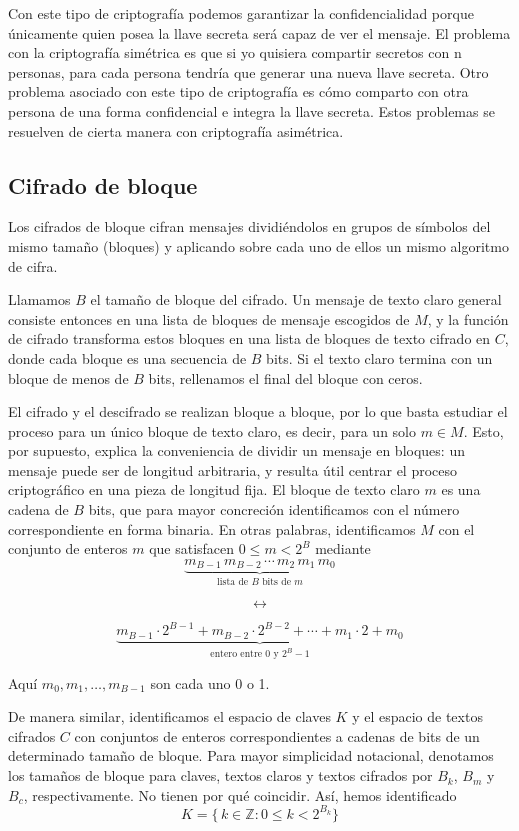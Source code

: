 Con este tipo de criptografía podemos garantizar la confidencialidad porque únicamente quien posea la llave secreta será capaz de ver el mensaje.
El problema con la criptografía simétrica es que si yo quisiera compartir secretos con n personas, para cada persona tendría que generar una nueva llave secreta.
Otro problema asociado con este tipo de criptografía es cómo comparto con otra persona de una forma confidencial e integra la llave secreta.
Estos problemas se resuelven de cierta manera con criptografía asimétrica.

\subsection{Cifrado de bloque}
Los cifrados de bloque cifran mensajes dividiéndolos en grupos de símbolos del mismo tamaño (bloques) y aplicando sobre cada uno de ellos un mismo algoritmo de cifra.

Llamamos \(B\) el tamaño de bloque del cifrado. Un mensaje de texto claro general consiste entonces en una lista de bloques de mensaje escogidos de \(M\), y la función de cifrado transforma estos bloques en una lista de bloques de texto cifrado en \(C\), donde cada bloque es una secuencia de \(B\) bits. Si el texto claro termina con un bloque de menos de \(B\) bits, rellenamos el final del bloque con ceros.

El cifrado y el descifrado se realizan bloque a bloque, por lo que basta estudiar el proceso para un único bloque de texto claro, es decir, para un solo \(m\in M\). Esto, por supuesto, explica la conveniencia de dividir un mensaje en bloques: un mensaje puede ser de longitud arbitraria, y resulta útil centrar el proceso criptográfico en una pieza de longitud fija. El bloque de texto claro \(m\) es una cadena de \(B\) bits, que para mayor concreción identificamos con el número correspondiente en forma binaria. En otras palabras, identificamos \(M\) con el conjunto de enteros \(m\) que satisfacen \(0 \le m < 2^B\) mediante
\[
\underbrace{m_{B-1}\,m_{B-2}\,\cdots\,m_2\,m_1\,m_0}_{\text{lista de \(B\) bits de \(m\)}}
\]

\[
\longleftrightarrow
\]

\[
\underbrace{m_{B-1}\cdot2^{B-1} + m_{B-2}\cdot2^{B-2} + \cdots + m_1\cdot2 + m_0}_{\text{entero entre 0 y \(2^B-1\)}}
\]

Aquí \(m_0,m_1,\dots,m_{B-1}\) son cada uno 0 o 1.

De manera similar, identificamos el espacio de claves \(K\) y el espacio de textos cifrados \(C\) con conjuntos de enteros correspondientes a cadenas de bits de un determinado tamaño de bloque. Para mayor simplicidad notacional, denotamos los tamaños de bloque para claves, textos claros y textos cifrados por \(B_k\), \(B_m\) y \(B_c\), respectivamente. No tienen por qué coincidir. Así, hemos identificado
\[
K = \{\,k \in \mathbb{Z} : 0 \le k < 2^{B_k}\}
\]


